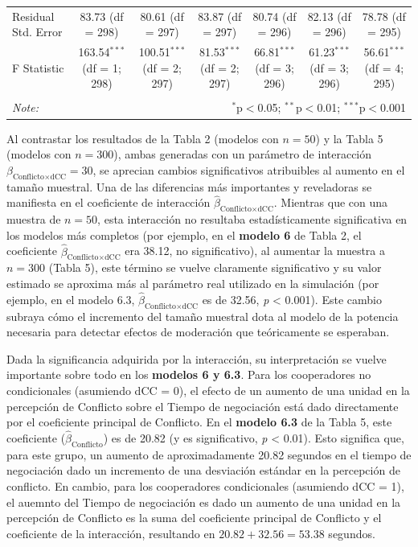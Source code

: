 \documentclass[
  spanish,
  10pt,
]{article}
\begin{document}
\begin{table}[H]
\begin{tabular}{@{\extracolsep{5pt}}lcccccc}
Residual Std. Error & 83.73 (df = 298) & 80.61 (df = 297) & 83.87 (df = 297) & 80.74 (df = 296) & 82.13 (df = 296) & 78.78 (df = 295) \\ 
F Statistic & 163.54$^{***}$ (df = 1; 298) & 100.51$^{***}$ (df = 2; 297) & 81.53$^{***}$ (df = 2; 297) & 66.81$^{***}$ (df = 3; 296) & 61.23$^{***}$ (df = 3; 296) & 56.61$^{***}$ (df = 4; 295) \\ 
\hline 
\hline \\[-1.8ex] 
\textit{Note:}  & \multicolumn{6}{r}{$^{*}$p$<$0.05; $^{**}$p$<$0.01; $^{***}$p$<$0.001} \\ 
\end{tabular} 
\end{table}

Al contrastar los resultados de la Tabla 2 (modelos con \(n=50\)) y la
Tabla 5 (modelos con \(n=300\)), ambas generadas con un parámetro de
interacción \(\beta_{\text{Conflicto} \times \text{dCC}} = 30\), se
aprecian cambios significativos atribuibles al aumento en el tamaño
muestral. Una de las diferencias más importantes y reveladoras se
manifiesta en el coeficiente de interacción
\(\hat{\beta}_{\text{Conflicto} \times \text{dCC}}\). Mientras que con
una muestra de \(n=50\), esta interacción no resultaba estadísticamente
significativa en los modelos más completos (por ejemplo, en el
\textbf{modelo 6} de Tabla 2, el coeficiente
\(\hat{\beta}_{\text{Conflicto} \times \text{dCC}}\) era 38.12, no
significativo), al aumentar la muestra a \(n=300\) (Tabla 5), este
término se vuelve claramente significativo y su valor estimado se
aproxima más al parámetro real utilizado en la simulación (por ejemplo,
en el modelo 6.3, \(\hat{\beta}_{\text{Conflicto} \times \text{dCC}}\)
es de 32.56, \emph{p} \textless{} 0.001). Este cambio subraya cómo el
incremento del tamaño muestral dota al modelo de la potencia necesaria
para detectar efectos de moderación que teóricamente se esperaban.

Dada la significancia adquirida por la interacción, su interpretación se
vuelve importante sobre todo en los \textbf{modelos 6 y 6.3}. Para los
cooperadores no condicionales (asumiendo dCC = 0), el efecto de un
aumento de una unidad en la percepción de Conflicto sobre el Tiempo de
negociación está dado directamente por el coeficiente principal de
Conflicto. En el \textbf{modelo 6.3} de la Tabla 5, este coeficiente
(\(\hat{\beta}_{\text{Conflicto}}\)) es de 20.82 (y es significativo,
\emph{p} \textless{} 0.01). Esto significa que, para este grupo, un
aumento de aproximadamente 20.82 segundos en el tiempo de negociación
dado un incremento de una desviación estándar en la percepción de
conflicto. En cambio, para los cooperadores condicionales (asumiendo dCC
= 1), el auemnto del Tiempo de negociación es dado un aumento de una
unidad en la percepción de Conflicto es la suma del coeficiente
principal de Conflicto y el coeficiente de la interacción, resultando en
\(20.82 + 32.56 = 53.38\) segundos.
\end{document}

